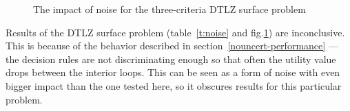 \begin{figure}
  \centering
  \caption{The impact of noise for the three-criteria DTLZ surface problem}
  \label{c3_surface_noise}
\end{figure}

Results of the DTLZ surface problem (table~\ref{t:noise} and
fig.\ref{c3_surface_noise}) are inconclusive. This is because of the behavior
described in section~\ref{nouncert-performance} --- the decision rules are not
discriminating enough so that often the utility value drops between the
interior loops. This can be seen as a form of noise with even bigger impact
than the one tested here, so it obscures results for this particular problem.

